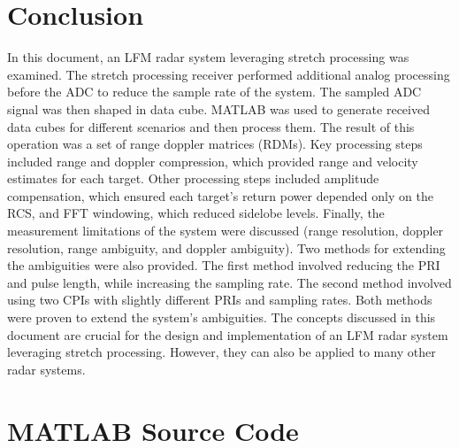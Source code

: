 \documentclass[conference]{IEEEtran}
\begin{document}
\section{Conclusion}
In this document, an LFM radar system leveraging stretch processing was examined. The stretch processing receiver performed additional analog processing before the ADC to reduce the sample rate of the system. The sampled ADC signal was then shaped in data cube. MATLAB was used to generate received data cubes for different scenarios and then process them. The result of this operation was a set of range doppler matrices (RDMs). Key processing steps included range and doppler compression, which provided range and velocity estimates for each target. Other processing steps included amplitude compensation, which ensured each target's return power depended only on the RCS, and FFT windowing, which reduced sidelobe levels. Finally, the measurement limitations of the system were discussed (range resolution, doppler resolution, range ambiguity, and doppler ambiguity). Two methods for extending the ambiguities were also provided. The first method involved reducing the PRI and pulse length, while increasing the sampling rate. The second method involved using two CPIs with slightly different PRIs and sampling rates. Both methods were proven to extend the system's ambiguities. The concepts discussed in this document are crucial for the design and implementation of an LFM radar system leveraging stretch processing. However, they can also be applied to many other radar systems.
\onecolumn
\pagebreak
\appendices
\section{MATLAB Source Code}
\label{matlab_code}
\lstset{style=Matlab-editor}

\raggedbottom
\pagebreak

\raggedbottom
\end{document}
